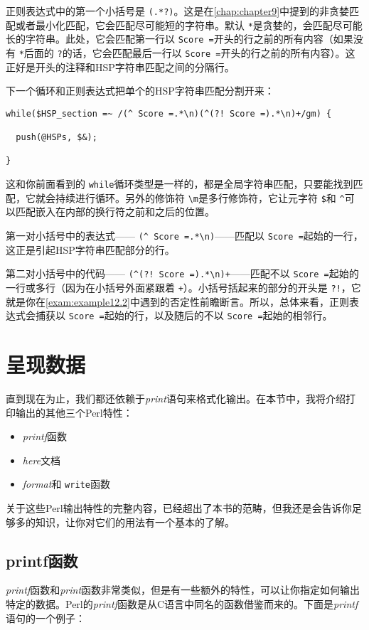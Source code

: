 正则表达式中的第一个小括号是 \verb|(.*?)|。这是在\autoref{chap:chapter9}中提到的非贪婪匹配或者最小化匹配，它会匹配尽可能短的字符串。默认 \verb|*|是贪婪的，会匹配尽可能长的字符串。此处，它会匹配第一行以 \verb|Score =|开头的行之前的所有内容（如果没有 \verb|*|后面的 \verb|?|的话，它会匹配最后一行以 \verb|Score =|开头的行之前的所有内容）。这正好是开头的注释和HSP字符串匹配之间的分隔行。

下一个循环和正则表达式把单个的HSP字符串匹配分割开来：

\begin{lstlisting}
while($HSP_section =~ /(^ Score =.*\n)(^(?! Score =).*\n)+/gm) {
  
  push(@HSPs, $&);

}
\end{lstlisting}

这和你前面看到的 \verb|while|循环类型是一样的，都是全局字符串匹配，只要能找到匹配，它就会持续进行循环。另外的修饰符 \verb|\m|是多行修饰符，它让元字符 \verb|$|和 \verb|^|可以匹配嵌入在内部的换行符之前和之后的位置。

第一对小括号中的表达式—— \verb|(^ Score =.*\n)|——匹配以 \verb|Score =|起始的一行，这正是引起HSP字符串匹配部分的行。

第二对小括号中的代码—— \verb|(^(?! Score =).*\n)+|——匹配不以 \verb|Score =|起始的一行或多行（因为在小括号外面紧跟着 \verb|+|）。小括号括起来的部分的开头是 \verb|?!|，它就是你在\autoref{exam:example12.2}中遇到的否定性前瞻断言。所以，总体来看，正则表达式会捕获以 \verb|Score =|起始的行，以及随后的不以 \verb|Score =|起始的相邻行。

\section{呈现数据}
直到现在为止，我们都还依赖于\textit{print}语句来格式化输出。在本节中，我将介绍打印输出的其他三个Perl特性：

\begin{itemize}
  \item \textit{printf}函数
  \item \textit{here}文档
  \item \textit{format}和 \verb|write|函数
\end{itemize}

关于这些Perl输出特性的完整内容，已经超出了本书的范畴，但我还是会告诉你足够多的知识，让你对它们的用法有一个基本的了解。

\subsection{printf函数}
\textit{printf}函数和\textit{print}函数非常类似，但是有一些额外的特性，可以让你指定如何输出特定的数据。Perl的\textit{printf}函数是从C语言中同名的函数借鉴而来的。下面是\textit{printf}语句的一个例子：

